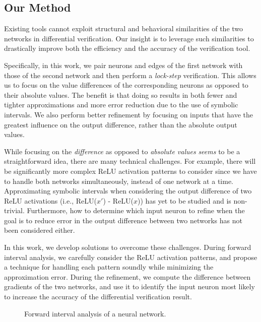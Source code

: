 \subsection{Our Method}

Existing tools cannot exploit structural and behavioral similarities
of the two networks in differential verification.  Our insight is to
leverage such similarities to drastically improve both the efficiency
and the accuracy of the verification tool.


Specifically, in this work, we pair neurons and edges of the first
network with those of the second network and then perform
a \emph{lock-step} verification.  This allows us to focus on the value
differences of the corresponding neurons as opposed to their absolute
values. The benefit is that doing so results in both fewer and tighter approximations
and more error reduction due to the use of symbolic intervals.
%
We also perform better refinement by focusing on inputs that have the
greatest influence on the output difference, rather than the
absolute output values.

While focusing on the \emph{difference} as opposed to \emph{absolute
values} \textit{seems} to be a straightforward idea, there are many technical challenges.
For example, there will be significantly more complex ReLU activation
patterns to consider since we have to handle both networks
simultaneously, instead of one network at a time.  Approximating
symbolic intervals when considering the output difference of two ReLU
activations (i.e., ReLU($ x' $) - ReLU($ x $)) has yet to be studied
and is non-trivial.  Furthermore, how to determine which input neuron
to refine when the goal is to reduce error in the output difference
between two networks has not been considered either.


In this work, we develop solutions to overcome these challenges.
During forward interval analysis, we carefully consider the ReLU
activation patterns, and propose a technique for handling each pattern
soundly while minimizing the approximation error.  During the
refinement, we compute the difference between gradients of the two
networks, and use it to identify the input neuron most likely to
increase the accuracy of the differential verification result.


\begin{figure}
\centering
\scalebox{1.0}{}
\caption{Forward interval analysis of a neural network.}
\label{fig:forward-pass-example}
\end{figure}



